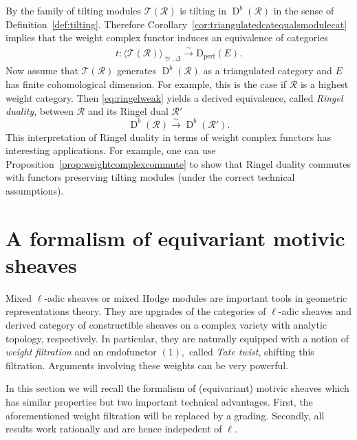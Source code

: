 \documentclass{amsart}
\theoremstyle{plain}
\theoremstyle{TheoremNum}
\theoremstyle{definition}
\theoremstyle{remark}
\numberwithin{equation}{section}
\newcommand{\Rr}{\mathcal{R}}
\newcommand{\Tt}{\mathcal{T}}
\newcommand{\Dperf}{\operatorname{D_{perf}}}
\newcommand{\DerG}{\operatorname{D}}
\begin{document}
By \cite[Theorems 3.11, 3.56]{brundan_semi-infinite_2021} the family of tilting modules $\Tt(\Rr)$ is tilting in $\DerG^b(\Rr)$ in the sense of Definition~\ref{def:tilting}. Therefore Corollary~\ref{cor:triangulatedcatequalsmodulecat} implies that the weight complex functor induces an equivalence of categories
\begin{align}
    t:\langle \Tt(\Rr) \rangle_{\cong, \Delta}\stackrel{\sim}{\to} \Dperf(E).\label{eq:ringelweak}
\end{align}
Now assume that $\Tt(\Rr)$ generates $\DerG^b(\Rr)$ as a triangulated category and $E$ has finite cohomological dimension. For example, this is the case if $\Rr$ is a highest weight category. Then \eqref{eq:ringelweak} yields a derived equivalence, called \emph{Ringel duality}, between $\Rr$ and its Ringel dual $\Rr'$
$$\DerG^b(\Rr)\stackrel{\sim}{\to} \DerG^b(\Rr').$$
This interpretation of Ringel duality in terms of weight complex functors has interesting applications. For example, one can use Proposition~\ref{prop:weightcomplexcommute} to show that Ringel duality commutes with functors preserving tilting modules (under the correct technical assumptions).

\section{A formalism of equivariant motivic sheaves}\label{sec:formalismofequivariantmotivicsheaves}

Mixed $\ell$-adic sheaves or mixed Hodge modules are important tools in geometric representations theory. They are upgrades of the categories of $\ell$-adic sheaves and derived category of constructible sheaves on a complex variety with analytic topology, respectively. In particular, they are naturally equipped with a notion of \emph{weight filtration} and an endofunctor $(1),$ called \emph{Tate twist}, shifting this filtration. Arguments involving these weights can be very powerful.

In this section we will recall the formalism of (equivariant) motivic sheaves which has similar properties but two important technical advantages. First, the aforementioned weight filtration will be replaced by a grading. Secondly, all results work rationally and are hence indepedent of $\ell.$
\end{document}
